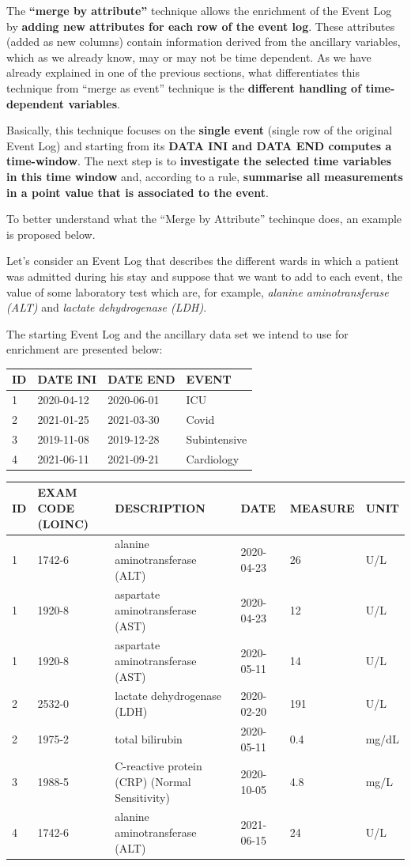 \documentclass[
]{book}
\begin{document}
The \textbf{``merge by attribute''} technique allows the enrichment of the Event Log by \textbf{adding new attributes for each row of the event log}.
These attributes (added as new columns) contain information derived from the ancillary variables, which as we already know, may or may not be time dependent.
As we have already explained in one of the previous sections, what differentiates this technique from ``merge as event'' technique is the \textbf{different handling of time-dependent variables}.

Basically, this technique focuses on the \textbf{single event} (single row of the original Event Log) and starting from its \textbf{DATA INI and DATA END computes a time-window}. The next step is to \textbf{investigate the selected time variables in this time window} and, according to a rule, \textbf{summarise all measurements in a point value that is associated to the event}.

To better understand what the ``Merge by Attribute'' techinque does, an example is proposed below.

Let's consider an Event Log that describes the different wards in which a patient was admitted during his stay and suppose that we want to add to each event, the value of some laboratory test which are, for example, \emph{alanine aminotransferase (ALT)} and \emph{lactate dehydrogenase (LDH)}.

The starting Event Log and the ancillary data set we intend to use for enrichment are presented below:

\begin{longtable}[]{@{}llll@{}}
\toprule
ID & DATE INI & DATE END & EVENT \\
\midrule
\endhead
1 & 2020-04-12 & 2020-06-01 & ICU \\
2 & 2021-01-25 & 2021-03-30 & Covid \\
3 & 2019-11-08 & 2019-12-28 & Subintensive \\
4 & 2021-06-11 & 2021-09-21 & Cardiology \\
\bottomrule
\end{longtable}

\begin{longtable}[]{@{}llllll@{}}
\toprule
ID & EXAM CODE (LOINC) & DESCRIPTION & DATE & MEASURE & UNIT \\
\midrule
\endhead
1 & 1742-6 & alanine aminotransferase (ALT) & 2020-04-23 & 26 & U/L \\
1 & 1920-8 & aspartate aminotransferase (AST) & 2020-04-23 & 12 & U/L \\
1 & 1920-8 & aspartate aminotransferase (AST) & 2020-05-11 & 14 & U/L \\
2 & 2532-0 & lactate dehydrogenase (LDH) & 2020-02-20 & 191 & U/L \\
2 & 1975-2 & total bilirubin & 2020-05-11 & 0.4 & mg/dL \\
3 & 1988-5 & C-reactive protein (CRP) (Normal Sensitivity) & 2020-10-05 & 4.8 & mg/L \\
4 & 1742-6 & alanine aminotransferase (ALT) & 2021-06-15 & 24 & U/L \\
\bottomrule
\end{longtable}
\end{document}
